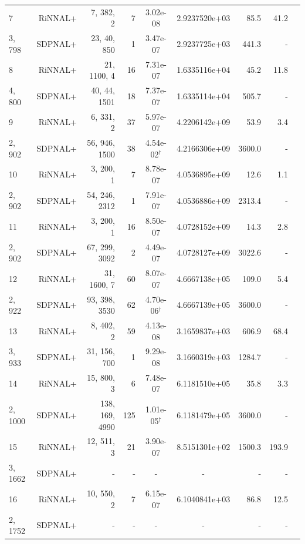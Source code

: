 \documentclass[11pt]{article}
\theoremstyle{plain}
\begin{document}
\begin{footnotesize}
\begin{longtable}[c]{lrrrccrrr}
7& RiNNAL+ & 7, 382, 2 & 7 & 3.02e-08 & 2.9237520e+03 & 85.5 &41.2 \\ 
3, 798& SDPNAL+ & 23, 40, 850 & 1& 3.47e-07 & 2.9237725e+03 & 441.3 & - \\ [3pt] 

8& RiNNAL+ & 21, 1100, 4 & 16 & 7.31e-07 & 1.6335116e+04 & 45.2 &11.8 \\ 
4, 800& SDPNAL+ & 40, 44, 1501 & 18& 7.37e-07 & 1.6335114e+04 & 505.7 & - \\ [3pt] 

9& RiNNAL+ & 6, 331, 2 & 37 & 5.97e-07 & 4.2206142e+09 & 53.9 &3.4 \\ 
2, 902& SDPNAL+ & 56, 946, 1500 & 38& 4.54e-02$^{\dagger}$ & 4.2166306e+09 & 3600.0 & - \\ [3pt] 

10& RiNNAL+ & 3, 200, 1 & 7 & 8.78e-07 & 4.0536895e+09 & 12.6 &1.1 \\ 
2, 902& SDPNAL+ & 54, 246, 2312 & 1& 7.91e-07 & 4.0536886e+09 & 2313.4 & - \\ [3pt] 

11& RiNNAL+ & 3, 200, 1 & 16 & 8.50e-07 & 4.0728152e+09 & 14.3 &2.8 \\ 
2, 902& SDPNAL+ & 67, 299, 3092 & 2& 4.49e-07 & 4.0728127e+09 & 3022.6 & - \\ [3pt] 

12& RiNNAL+ & 31, 1600, 7 & 60 & 8.07e-07 & 4.6667138e+05 & 109.0 &5.4 \\ 
2, 922& SDPNAL+ & 93, 398, 3530 & 62& 4.70e-06$^{\dagger}$ & 4.6667139e+05 & 3600.0 & - \\ [3pt] 

13& RiNNAL+ & 8, 402, 2 & 59 & 4.13e-08 & 3.1659837e+03 & 606.9 &68.4 \\ 
3, 933& SDPNAL+ & 31, 156, 700 & 1& 9.29e-08 & 3.1660319e+03 & 1284.7 & - \\ [3pt] 

14& RiNNAL+ & 15, 800, 3 & 6 & 7.48e-07 & 6.1181510e+05 & 35.8 &3.3 \\ 
2, 1000& SDPNAL+ & 138, 169, 4990 & 125& 1.01e-05$^{\dagger}$ & 6.1181479e+05 & 3600.0 & - \\ [3pt] 

15& RiNNAL+ & 12, 511, 3 & 21 & 3.90e-07 & 8.5151301e+02 & 1500.3 &193.9 \\ 
3, 1662& SDPNAL+ & - & - & - & - & - & - \\ [3pt] 

16& RiNNAL+ & 10, 550, 2 & 7 & 6.15e-07 & 6.1040841e+03 & 86.8 &12.5 \\ 
2, 1752& SDPNAL+ & - & - & - & - & - & - \\ [3pt] 


\end{longtable}
\end{footnotesize}
\end{document}
